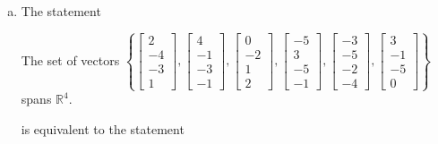 \begin{exerciseAnswer}
\begin{enumerate}[(a)]
\item The statement 
\begin{center}\begin{minipage}{0.8\textwidth}
 The set of vectors \( \left\{ \left[\begin{array}{c}
2 \\
-4 \\
-3 \\
1
\end{array}\right] , \left[\begin{array}{c}
4 \\
-1 \\
-3 \\
-1
\end{array}\right] , \left[\begin{array}{c}
0 \\
-2 \\
1 \\
2
\end{array}\right] , \left[\begin{array}{c}
-5 \\
3 \\
-5 \\
-1
\end{array}\right] , \left[\begin{array}{c}
-3 \\
-5 \\
-2 \\
-4
\end{array}\right] , \left[\begin{array}{c}
3 \\
-1 \\
-5 \\
0
\end{array}\right] \right\} \) spans \(\mathbb{R}^4\). 
\end{minipage}\end{center}
     is equivalent to the statement 
\begin{center}\begin{minipage}{0.8\textwidth}
 The vector equation \( x_{1} \left[\begin{array}{c}
2 \\
-4 \\
-3 \\
1
\end{array}\right] + x_{2} \left[\begin{array}{c}
4 \\
-1 \\

\end{array}
\end{minipage}
\end{center}
\end{enumerate}
\end{exerciseAnswer}
